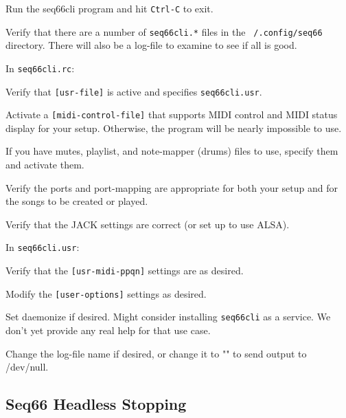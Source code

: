    \begin{enumber}
      \item Run the seq66cli program and hit \texttt{Ctrl-C} to exit.
      \item Verify that there are a number of \texttt{seq66cli.*}
         files in the \texttt{~/.config/seq66} directory.
         There will also be a log-file to examine to see if all is good.
      \item In \texttt{seq66cli.rc}:
      \begin{enumber}
         \item Verify that \texttt{[usr-file]}
            is active and specifies \texttt{seq66cli.usr}.
         \item Activate a \texttt{[midi-control-file]} that supports
            MIDI control and MIDI status display for your setup.
            Otherwise, the program will be nearly impossible to use.
         \item If you have mutes, playlist, and note-mapper (drums) files to 
             use, specify them and activate them.
         \item Verify the ports and port-mapping are appropriate for
            both your setup and for the songs to be created or played.
         \item Verify that the JACK settings are correct (or set up to use
            ALSA).
      \end{enumber}
      \item In \texttt{seq66cli.usr}:
      \begin{enumber}
         \item Verify that the \texttt{[usr-midi-ppqn]} settings are
            as desired.
         \item Modify the \texttt{[user-options]} settings as desired.
         \item Set daemonize if desired. Might consider installing
            \texttt{seq66cli} as a service.
            We don't yet provide any real help for that use case.
         \item Change the log-file name if desired, or change it to "" to
            send output to /dev/null.
      \end{enumber}
   \end{enumber}

\subsection{Seq66 Headless Stopping}
\label{subsec:headless_stopping}


